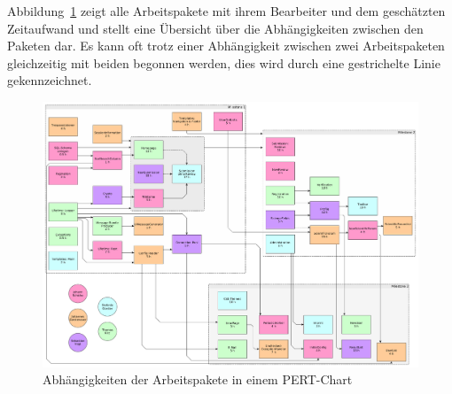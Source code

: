 
Abbildung~\ref{fig:pert} zeigt alle Arbeitspakete mit ihrem Bearbeiter und dem geschätzten Zeitaufwand
und stellt eine Übersicht über die Abhängigkeiten zwischen den Paketen dar.
Es kann oft trotz einer Abhängigkeit zwischen zwei Arbeitspaketen gleichzeitig mit beiden begonnen werden,
dies wird durch eine gestrichelte Linie gekennzeichnet.

\begin{figure}[h]
    \includegraphics[width=\textwidth]{graphics/pert-diagram}
    \caption{Abhängigkeiten der Arbeitspakete in einem PERT-Chart}
    \label{fig:pert}
\end{figure}